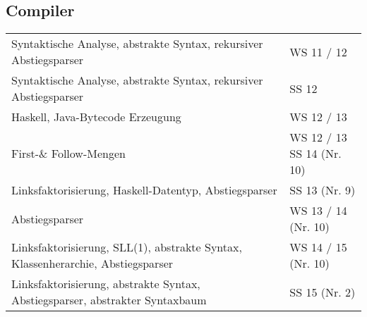 \subsection{Compiler}
\begin{table}[h]
	\centering
	\label{my-label}
	\begin{tabular}{ll}
		Syntaktische Analyse, abstrakte Syntax, rekursiver Abstiegsparser
		& WS 11 / 12 \open \\		
		
		Syntaktische Analyse, abstrakte Syntax, rekursiver Abstiegsparser
		& SS 12 \open \\
		
		Haskell, Java-Bytecode Erzeugung
		& WS 12 / 13 \open \\
		
		First-\& Follow-Mengen 
		& \multlineTable{WS 12 / 13 \open\\ SS 14 (Nr. 10)} \\	
		
		Linksfaktorisierung, Haskell-Datentyp, Abstiegsparser 
		& SS 13 (Nr. 9) \\
		
		Abstiegsparser 
		& WS 13 / 14 (Nr. 10) \\	
		
		Linksfaktorisierung, SLL(1), abstrakte Syntax, Klassenherarchie, Abstiegsparser
		& WS 14 / 15 (Nr. 10) \\	
		
		Linksfaktorisierung, abstrakte Syntax, Abstiegsparser, abstrakter Syntaxbaum
		& SS 15 (Nr. 2) \\
	\end{tabular}
\end{table}
~\\